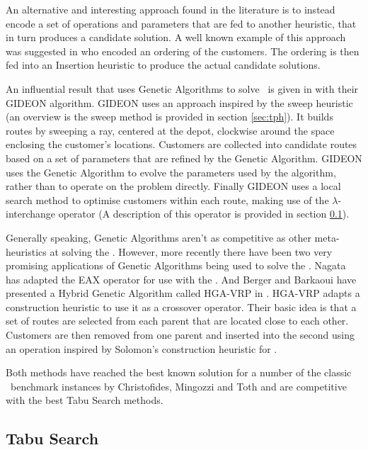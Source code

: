 An alternative and interesting approach found in the literature is to instead encode a set of operations and parameters that are fed to another heuristic, that in turn produces a candidate solution. A well known example of this approach was suggested in \cite{BW:1993} who encoded an ordering of the customers. The ordering is then fed into an Insertion heuristic to produce the actual candidate solutions.

An influential result that uses Genetic Algorithms to solve \VRPTW\ is given in \cite{TNJ:1991} with their GIDEON algorithm. GIDEON uses an approach inspired by the sweep heuristic (an overview is the sweep method is provided in section \ref{sec:tph}). It builds routes by sweeping a ray, centered at the depot, clockwise around the space enclosing the customer's locations. Customers are collected into candidate routes based on a set of parameters that are refined by the Genetic Algorithm. GIDEON uses the Genetic Algorithm to evolve the parameters used by the algorithm, rather than to operate on the problem directly. Finally GIDEON uses a local search method to optimise customers within each route, making use of the $\lambda$-interchange operator (A description of this operator is provided in section \ref{sec:ts}).

Generally speaking, Genetic Algorithms aren't as competitive as other meta-heuristics at solving the \VRP. However, more recently there have been two very promising applications of Genetic Algorithms being used to solve the \VRP. Nagata \cite{Nagata:2007} has adapted the EAX operator for use with the \VRP. And Berger and Barkaoui have presented a Hybrid Genetic Algorithm called HGA-VRP in \cite{BM:2003}. HGA-VRP adapts a construction heuristic to use it as a crossover operator. Their basic idea is that a set of routes are selected from each parent that are located close to each other. Customers are then removed from one parent and inserted into the second using an operation inspired by Solomon's construction heuristic for \VRPTW \cite{Solomon:1987}.

Both methods have reached the best known solution for a number of the classic \VRP\ benchmark instances by Christofides, Mingozzi and Toth \cite{CMT:1981} and are competitive with the best Tabu Search methods.

\subsection{Tabu Search}
\label{sec:ts}

